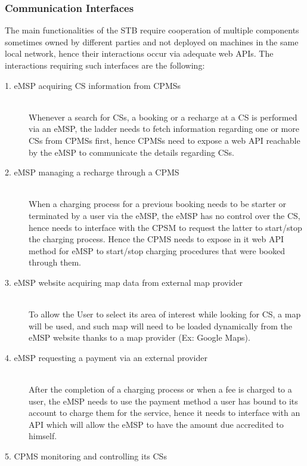 \documentclass[11pt]{article}
\begin{document}
\subsubsection{Communication Interfaces}


The main functionalities of the STB require cooperation of multiple components sometimes owned by different parties and not deployed on machines in the same local network, hence their interactions occur via adequate web APIs. The interactions requiring such interfaces are the following:

\begin{description}
    \item [1. eMSP acquiring CS information from CPMSs] \hfill \\
        Whenever a search for CSs, a booking or a recharge at a CS is performed via an eMSP, the ladder needs to fetch information regarding one or more CSs from CPMSs first, hence CPMSs need to expose a web API reachable by the eMSP to communicate the details regarding CSs.
    \item [2. eMSP  managing a recharge through a CPMS] \hfill \\
        When a charging process for a previous booking needs to be starter or terminated by a user via the eMSP, the eMSP has no control over the CS, hence needs to interface with the CPSM to request the latter to start/stop the charging process. Hence the CPMS needs to expose in it web API method for eMSP to start/stop charging procedures that were booked through them.
    \item [3. eMSP website acquiring map data from external map provider] \hfill \\
        To allow the User to select its area of interest while looking for CS, a map will be used, and such map will need to be loaded dynamically from the eMSP website thanks to a map provider (Ex: Google Maps).
    \item [4. eMSP requesting a payment via an external provider] \hfill \\
        After the completion of a charging process or when a fee is charged to a user, the eMSP needs to use the payment method a user has bound to its account to charge them for the service, hence it needs to interface with an API which will allow the eMSP to have the amount due accredited to himself.
    \item [5. CPMS monitoring and controlling its CSs] \hfill \\

\end{description}
\end{document}
